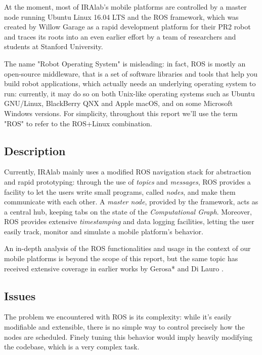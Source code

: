 \documentclass[a4paper,12pt]{report}
\begin{document}
At the moment, most of IRAlab's mobile platforms are controlled by a master node running Ubuntu Linux 16.04 LTS and the ROS framework, which was created by Willow Garage as a rapid development platform for their PR2 robot and traces its roots into an even earlier effort by a team of researchers and students at Stanford University. 

The name "Robot Operating System" is misleading: in fact, ROS is mostly an open-source middleware, that is a set of software libraries and tools that help you build robot applications, which actually needs an underlying operating system to run: currently, it may do so on both Unix-like operating systems such as Ubuntu GNU/Linux, BlackBerry QNX \cite{qnx-ros} and Apple macOS, and on some Microsoft Windows versions. For simplicity, throughout this report we'll use the term "ROS" to refer to the ROS+Linux combination.

\subsection{Description}

Currently, IRAlab mainly uses a modified ROS navigation stack for abstraction and rapid prototyping: through the use of \textit{topics} and \textit{messages}, ROS provides a facility to let the users write small programs, called \textit{nodes}, and make them communicate with each other. A \textit{master node}, provided by the framework, acts as a central hub, keeping tabs on the state of the \textit{Computational Graph}. Moreover, ROS provides extensive \textit{timestamping} and data logging facilities, letting the user easily track, monitor and simulate a mobile platform's behavior.

An in-depth analysis of the ROS functionalities and usage in the context of our mobile platforms is beyond the scope of this report, but the same topic has received extensive coverage in earlier works by Gerosa* and Di Lauro \cite{fdila-bs-otto}.

\subsection{Issues}

The problem we encountered with ROS is its complexity: while it's easily modifiable and extensible, there is no simple way to control precisely how the nodes are scheduled. Finely tuning this behavior would imply heavily modifying the codebase, which is a very complex task.
\end{document}
